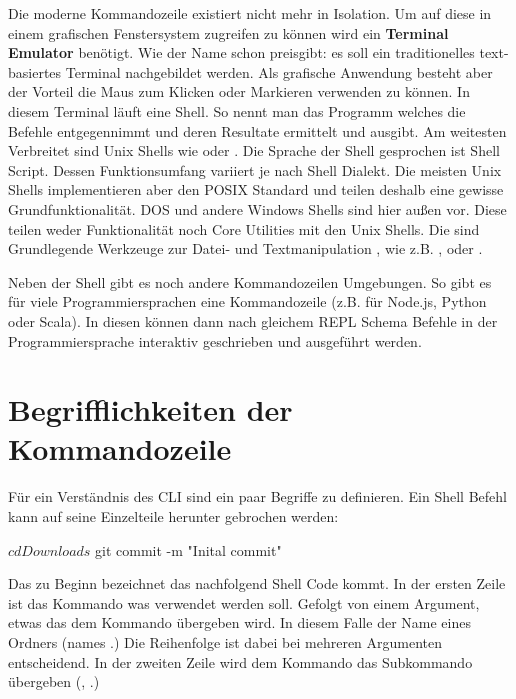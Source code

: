 \documentclass[oneside,bibliography=totocnumbered,BCOR=5mm]{scrbook}
\newenvironment{code}{\captionsetup{type=listing, skip=0pt}}{}
\begin{document}
Die moderne Kommandozeile existiert nicht mehr in Isolation. Um auf diese in
einem grafischen Fenstersystem zugreifen zu können wird ein \textbf{Terminal
Emulator} benötigt. Wie der Name schon preisgibt: es soll ein traditionelles
text-basiertes Terminal nachgebildet werden. Als grafische Anwendung besteht
aber der Vorteil die Maus zum Klicken oder Markieren verwenden zu können. In
diesem Terminal läuft eine Shell. So nennt man das Programm welches die Befehle
entgegennimmt und deren Resultate ermittelt und ausgibt. Am weitesten Verbreitet
sind Unix Shells wie  oder .
Die Sprache der Shell gesprochen ist Shell Script. Dessen Funktionsumfang
variiert je nach Shell Dialekt. Die meisten Unix Shells implementieren aber den POSIX
Standard und teilen deshalb eine gewisse Grundfunktionalität. DOS und andere
Windows Shells sind hier außen vor. Diese teilen weder Funktionalität noch Core
Utilities mit den Unix Shells. Die  sind Grundlegende
Werkzeuge zur Datei- und Textmanipulation \parencite{coreutils}, wie z.B.
,  oder .


\medskip

Neben der Shell gibt es noch andere Kommandozeilen Umgebungen. So gibt es
für viele Programmiersprachen eine Kommandozeile (z.B. für Node.js, Python
oder Scala). In diesen können dann nach gleichem REPL Schema Befehle in der
Programmiersprache interaktiv geschrieben und ausgeführt werden.

\section{Begrifflichkeiten der Kommandozeile}

Für ein Verständnis des CLI sind ein paar Begriffe zu definieren. Ein Shell
Befehl kann auf seine Einzelteile herunter gebrochen werden:

\begin{code}
  \begin{shellcode}
$ cd Downloads
$ git commit -m "Inital commit"
  \end{shellcode}
\end{code}

Das \codeinline{\$} zu Beginn bezeichnet das nachfolgend Shell Code kommt. In
der ersten Zeile ist  das Kommando was verwendet werden soll.
Gefolgt von einem Argument, etwas das dem Kommando übergeben wird. In diesem
Falle der Name eines Ordners (names .) Die Reihenfolge
ist dabei bei mehreren Argumenten entscheidend. In der zweiten Zeile wird
dem  Kommando das Subkommando  übergeben
(\textcite{nagarajan2018}, \textcite{clig}.)
\end{document}
